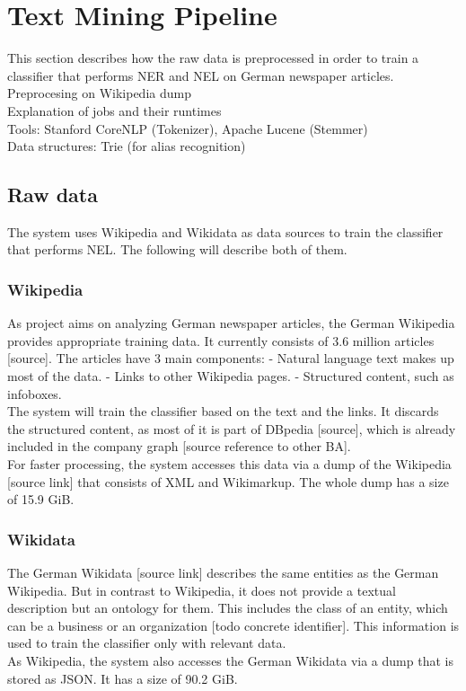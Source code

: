 \section{Text Mining Pipeline}
\label{sec:pipeline}
This section describes how the raw data is preprocessed in order to train a classifier that performs NER and NEL on German newspaper articles.
~\\
Preprocesing on Wikipedia dump\\
Explanation of jobs and their runtimes\\
Tools: Stanford CoreNLP (Tokenizer), Apache Lucene (Stemmer)\\
Data structures: Trie (for alias recognition)\\

\subsection{Raw data}
The system uses Wikipedia and Wikidata as data sources to train the classifier that performs NEL. The following will describe both of them.

\subsubsection{Wikipedia}
As project aims on analyzing German newspaper articles, the German Wikipedia provides appropriate training data. It currently consists of 3.6 million articles [source]. The articles have 3 main components: - Natural language text makes up most of the data. - Links to other Wikipedia pages. - Structured content, such as infoboxes.\\
The system will train the classifier based on the text and the links. It discards the structured content, as most of it is part of DBpedia [source], which is already included in the company graph [source reference to other BA].\\
For faster processing, the system accesses this data via a dump of the Wikipedia [source link] that consists of XML and Wikimarkup. The whole dump has a size of 15.9 GiB.

\subsubsection{Wikidata}
The German Wikidata [source link] describes the same entities as the German Wikipedia. But in contrast to Wikipedia, it does not provide a textual description but an ontology for them. This includes the class of an entity, which can be a business or an organization [todo concrete identifier]. This information is used to train the classifier only with relevant data.\\
As Wikipedia, the system also accesses the German Wikidata via a dump that is stored as JSON. It has a size of 90.2 GiB.

